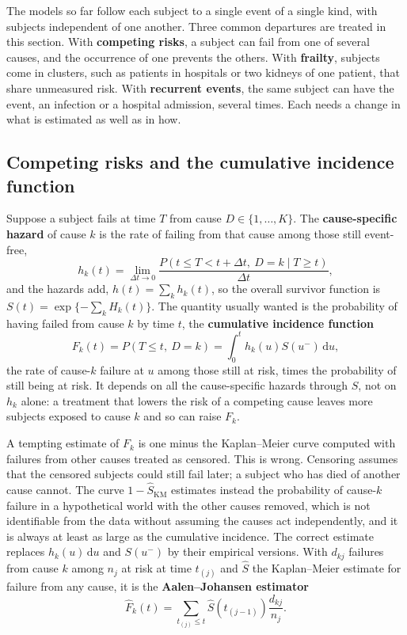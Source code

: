 \documentclass[11pt,a4paper]{article}
\numberwithin{equation}{section}
\theoremstyle{definition}
\begin{document}
The models so far follow each subject to a single event of a single kind, with subjects independent of one another. Three common departures are treated in this section. With \textbf{competing risks}, a subject can fail from one of several causes, and the occurrence of one prevents the others. With \textbf{frailty}, subjects come in clusters, such as patients in hospitals or two kidneys
of one patient, that share unmeasured risk. With \textbf{recurrent events}, the same subject can have the event, an infection or a hospital admission, several times. Each needs a change in what is estimated as well as in how.

\subsection{Competing risks and the cumulative incidence function}
\label{ssec:competing}

Suppose a subject fails at time $T$ from cause $D \in \{1, \dots, K\}$. The \textbf{cause-specific hazard} of cause $k$ is the rate of failing from that cause among those still event-free,
\[
h_k(t) = \lim_{\Delta t \to 0}\frac{P(t \le T < t + \Delta t,\ D = k \mid T \ge t)}{\Delta t} ,
\]
and the hazards add, $h(t) = \sum_k h_k(t)$, so the overall survivor function is $S(t) = \exp\{-\sum_k H_k(t)\}$. The quantity usually wanted is the probability of having failed from cause $k$ by time $t$, the \textbf{cumulative incidence function}
\[
F_k(t) = P(T \le t,\ D = k) = \int_0^t h_k(u)S(u^-)\,\mathrm du ,
\]
the rate of cause-$k$ failure at $u$ among those still at risk, times the probability of still being at risk. It depends on all the cause-specific hazards through $S$, not on $h_k$ alone: a treatment that lowers the risk of a competing cause leaves more subjects exposed to cause $k$ and so can raise $F_k$.

A tempting estimate of $F_k$ is one minus the Kaplan--Meier curve computed with failures from other causes treated as censored. This is wrong. Censoring assumes that the censored subjects could still fail later; a subject who has died of another cause cannot. The curve $1 - \hat S_{\text{KM}}$ estimates instead the probability of cause-$k$ failure in a hypothetical world with the other causes removed, which is not
identifiable from the data without assuming the causes act independently, and it is always at least as large as the cumulative incidence. The correct estimate replaces $h_k(u)\,\mathrm du$ and $S(u^-)$ by their empirical versions. With $d_{kj}$ failures from cause $k$ among $n_j$ at risk at time $t_{(j)}$ and $\hat S$ the Kaplan--Meier estimate for failure from any cause, it is the
\textbf{Aalen--Johansen estimator}
\[
\hat F_k(t) = \sum_{t_{(j)} \le t}\hat S(t_{(j-1)})\frac{d_{kj}}{n_j} .
\]
\end{document}
